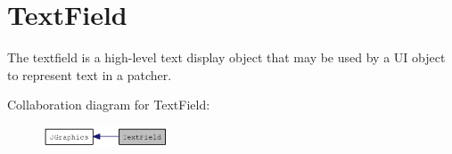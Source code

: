 \hypertarget{group__textfield}{
\section{TextField}
\label{group__textfield}
}


The textfield is a high-\/level text display object that may be used by a UI object to represent text in a patcher.  


Collaboration diagram for TextField:\nopagebreak
\begin{figure}[H]
\begin{center}
\leavevmode
\includegraphics[width=106pt]{group__textfield}
\end{center}
\end{figure}
